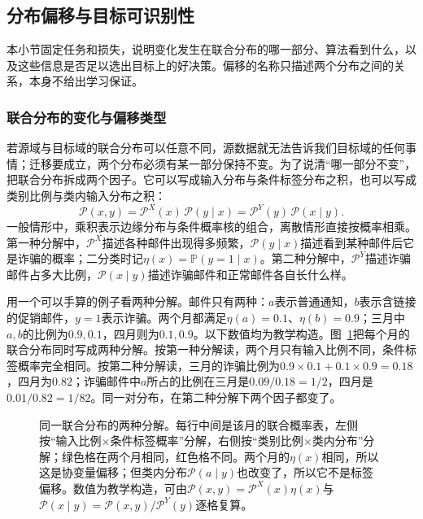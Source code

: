 \subsection{分布偏移与目标可识别性}
\label{sec:transfer-identifiability}

本小节固定任务和损失，说明变化发生在联合分布的哪一部分、算法看到什么，以及这些信息是否足以选出目标上的好决策。偏移的名称只描述两个分布之间的关系，本身不给出学习保证。

\subsubsection{联合分布的变化与偏移类型}
\label{sec:distribution-shift}

若源域与目标域的联合分布可以任意不同，源数据就无法告诉我们目标域的任何事情；迁移要成立，两个分布必须有某一部分保持不变。为了说清“哪一部分不变”，把联合分布拆成两个因子。它可以写成输入分布与条件标签分布之积，也可以写成类别比例与类内输入分布之积：
\begin{equation}
 \mathcal P(x,y)=\mathcal P^X(x)\,\mathcal P(y\mid x)
               =\mathcal P^Y(y)\,\mathcal P(x\mid y).
 \label{eq:transfer-two-factorizations}
\end{equation}
一般情形中，乘积表示边缘分布与条件概率核的组合，离散情形直接按概率相乘。第一种分解中，$\mathcal P^X$描述各种邮件出现得多频繁，$\mathcal P(y\mid x)$描述看到某种邮件后它是诈骗的概率；二分类时记$\eta(x)=\mathbb P(y=1\mid x)$。第二种分解中，$\mathcal P^Y$描述诈骗邮件占多大比例，$\mathcal P(x\mid y)$描述诈骗邮件和正常邮件各自长什么样。

用一个可以手算的例子看两种分解。邮件只有两种：$a$表示普通通知，$b$表示含链接的促销邮件，$y=1$表示诈骗。两个月都满足$\eta(a)=0.1$、$\eta(b)=0.9$；三月中$a,b$的比例为$0.9,0.1$，四月则为$0.1,0.9$。以下数值均为教学构造。图~\ref{fig:lt9-joint-factorizations}把每个月的联合分布同时写成两种分解。按第一种分解读，两个月只有输入比例不同，条件标签概率完全相同。按第二种分解读，三月的诈骗比例为$0.9\times0.1+0.1\times0.9=0.18$，四月为$0.82$；诈骗邮件中$a$所占的比例在三月是$0.09/0.18=1/2$，四月是$0.01/0.82=1/82$。同一对分布，在第二种分解下两个因子都变了。

\begin{figure}[htbp]
 \centering
 
 \caption{同一联合分布的两种分解。每行中间是该月的联合概率表，左侧按“输入比例$\times$条件标签概率”分解，右侧按“类别比例$\times$类内分布”分解；绿色格在两个月相同，红色格不同。两个月的$\eta(x)$相同，所以这是协变量偏移；但类内分布$\mathcal P(a\mid y)$也改变了，所以它不是标签偏移。数值为教学构造，可由$\mathcal P(x,y)=\mathcal P^X(x)\eta(x)$与$\mathcal P(x\mid y)=\mathcal P(x,y)/\mathcal P^Y(y)$逐格复算。}
 \label{fig:lt9-joint-factorizations}
\end{figure}


